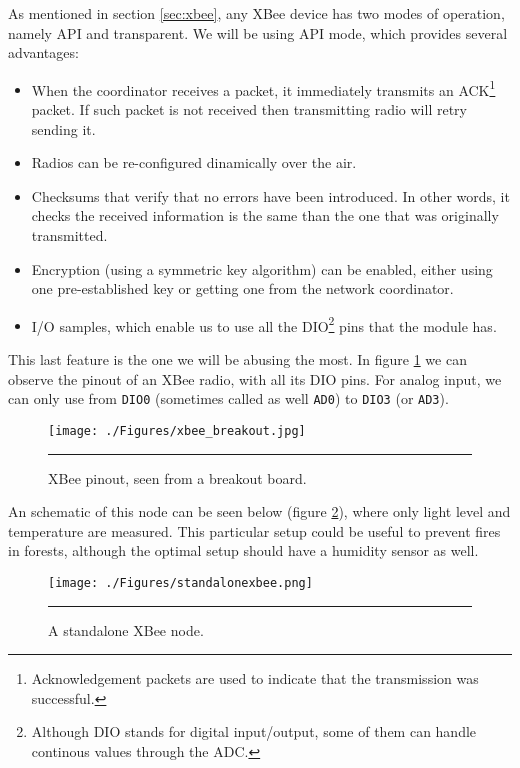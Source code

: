 As mentioned in section \ref{sec:xbee}, any XBee device has two modes of operation, namely API and transparent. We will be using API mode, which provides several advantages:

\begin{itemize}
    \item When the coordinator receives a packet, it immediately transmits an ACK\footnote{Acknowledgement packets are used to indicate that the transmission was successful.} packet. If such packet is not received then transmitting radio will retry sending it.
    \item Radios can be re-configured dinamically over the air.
    \item Checksums that verify that no errors have been introduced. In other words, it checks the received information is the same than the one that was originally transmitted.
    \item Encryption (using a symmetric key algorithm) can be enabled, either using one pre-established key or getting one from the network coordinator.
    \item I/O samples, which enable us to use all the DIO\footnote{Although DIO stands for digital input/output, some of them can handle continous values through the ADC.} pins that the module has.
\end{itemize}

This last feature is the one we will be abusing the most. In figure \ref{fig:XBeeBO} we can observe the pinout of an XBee radio, with all its DIO pins. For analog input, we can only use from \texttt{DIO0} (sometimes called as well \texttt{AD0}) to \texttt{DIO3} (or \texttt{AD3}).

\begin{figure}[htbp]
    \centering
        \texttt{[image: ./Figures/xbee\_breakout.jpg]}
        \rule{35em}{0.5pt}
    \caption[XBee pinout]{XBee pinout, seen from a breakout board.}
    \label{fig:XBeeBO}
\end{figure}

An schematic of this node can be seen below (figure \ref{fig:StandaloneXBee}), where only light level and temperature are measured. This particular setup could be useful to prevent fires in forests, although the optimal setup should have a humidity sensor as well.

\begin{figure}[htbp]
    \centering
        \texttt{[image: ./Figures/standalonexbee.png]}
        \rule{35em}{0.5pt}
    \caption[Standalone XBee]{A standalone XBee node.}
    \label{fig:StandaloneXBee}
\end{figure}

